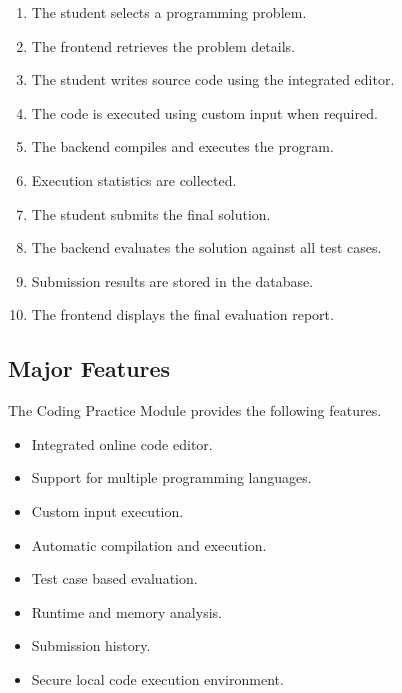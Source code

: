 \begin{enumerate}

\item The student selects a programming problem.

\item The frontend retrieves the problem details.

\item The student writes source code using the integrated editor.

\item The code is executed using custom input when required.

\item The backend compiles and executes the program.

\item Execution statistics are collected.

\item The student submits the final solution.

\item The backend evaluates the solution against all test cases.

\item Submission results are stored in the database.

\item The frontend displays the final evaluation report.

\end{enumerate}

\subsection{Major Features}

The Coding Practice Module provides the following features.

\begin{itemize}

\item Integrated online code editor.

\item Support for multiple programming languages.

\item Custom input execution.

\item Automatic compilation and execution.

\item Test case based evaluation.

\item Runtime and memory analysis.

\item Submission history.

\item Secure local code execution environment.

\end{itemize}

